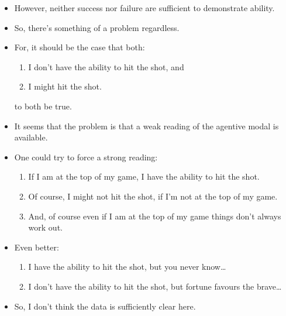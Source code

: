 \documentclass[10pt]{article}
\begin{document}
\begin{itemize}
\item However, neither success nor failure are sufficient to demonstrate ability.
\item So, there's something of a problem regardless.
\item For, it should be the case that both:
  \begin{enumerate}
  \item I don't have the ability to hit the shot, and
  \item I might hit the shot.
  \end{enumerate}
  to both be true.
\item It seems that the problem is that a weak reading of the agentive modal is available.
\item One could try to force a strong reading:
  \begin{enumerate}
  \item If I am at the top of my game, I have the ability to hit the shot.
  \item Of course, I might not hit the shot, if I'm not at the top of my game.
  \item And, of course even if I am at the top of my game things don't always work out.
  \end{enumerate}
\item Even better:
  \begin{enumerate}
  \item I have the ability to hit the shot, but you never know\dots
  \item I don't have the ability to hit the shot, but fortune favours the brave\dots
  \end{enumerate}
\item So, I don't think the data is sufficiently clear here.
\end{itemize}

\newpage
\end{document}
